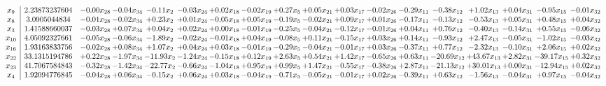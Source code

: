 \documentclass[9pt]{article}
\begin{document}
 \[\begin{array}{c| c c@{\hskip 2pt} c@{\hskip 2pt} c@{\hskip 2pt} c@{\hskip 2pt} c@{\hskip 2pt} c@{\hskip 2pt} c@{\hskip 2pt} c@{\hskip 2pt} c@{\hskip 2pt} c@{\hskip 2pt} c@{\hskip 2pt} c@{\hskip 2pt} c@{\hskip 2pt} c@{\hskip 2pt} c@{\hskip 2pt} c@{\hskip 2pt} }
 x_{9}   &  2.23873237604 & -0.00 x_{28} & -0.04 x_{34} & -0.11 x_{2} & -0.03 x_{24} & +  0.02 x_{18} & -0.02 x_{19} & +  0.27 x_{5} & +  0.05 x_{21} & +  0.03 x_{17} & -0.02 x_{26} & -0.29 x_{11} & -0.38 x_{12} & +  1.02 x_{13} & +  0.04 x_{31} & -0.95 x_{15} & -0.01 x_{32}\\
 x_{8}   &  3.0905044834 & -0.01 x_{28} & -0.02 x_{34} & +  0.23 x_{2} & +  0.01 x_{24} & -0.05 x_{18} & +  0.05 x_{19} & -0.19 x_{5} & -0.02 x_{21} & +  0.09 x_{17} & +  0.01 x_{26} & -0.17 x_{11} & -0.13 x_{12} & -0.53 x_{13} & +  0.05 x_{31} & +  0.48 x_{15} & +  0.04 x_{32}\\
 x_{3}   &  1.41588660037 & -0.03 x_{28} & +  0.07 x_{34} & +  0.04 x_{2} & +  0.02 x_{24} & +  0.00 x_{18} & -0.01 x_{19} & -0.25 x_{5} & -0.04 x_{21} & -0.12 x_{17} & -0.01 x_{26} & +  0.04 x_{11} & +  0.76 x_{12} & -0.40 x_{13} & -0.14 x_{31} & +  0.55 x_{15} & -0.06 x_{32}\\
 x_{10}   &  4.05092327661 & -0.05 x_{28} & -0.06 x_{34} & -1.89 x_{2} & -0.02 x_{24} & -0.01 x_{18} & +  0.04 x_{19} & -0.08 x_{5} & +  0.11 x_{21} & -0.15 x_{17} & +  0.03 x_{26} & +  0.14 x_{11} & -0.93 x_{12} & +  2.47 x_{13} & -0.05 x_{31} & -1.02 x_{15} & -0.03 x_{32}\\
 x_{16}   &  1.93163833756 & -0.02 x_{28} & +  0.08 x_{34} & +  1.07 x_{2} & +  0.04 x_{24} & +  0.03 x_{18} & -0.01 x_{19} & -0.29 x_{5} & -0.04 x_{21} & -0.01 x_{17} & +  0.03 x_{26} & -0.37 x_{11} & +  0.77 x_{12} & -2.32 x_{13} & -0.10 x_{31} & +  2.06 x_{15} & +  0.02 x_{32}\\
 x_{22}   &  33.1315194786 & +  0.22 x_{28} & -1.97 x_{34} & -11.93 x_{2} & -1.24 x_{24} & -0.15 x_{18} & +  0.12 x_{19} & +  2.63 x_{5} & +  0.54 x_{21} & +  1.42 x_{17} & -0.65 x_{26} & +  0.63 x_{11} & -20.69 x_{12} & + 43.67 x_{13} & +  2.82 x_{31} & -39.17 x_{15} & +  0.32 x_{32}\\
 x_{23}   &  41.7067584843 & -0.32 x_{28} & -1.42 x_{34} & -22.77 x_{2} & -0.66 x_{24} & -1.04 x_{18} & +  0.95 x_{19} & +  0.99 x_{5} & +  1.47 x_{21} & -0.55 x_{17} & -0.38 x_{26} & +  2.87 x_{11} & -21.13 x_{12} & + 30.01 x_{13} & +  0.00 x_{31} & -12.94 x_{15} & +  0.02 x_{32}\\
 x_{4}   &  1.92094776845 & -0.04 x_{28} & +  0.06 x_{34} & -0.15 x_{2} & +  0.06 x_{24} & +  0.03 x_{18} & -0.04 x_{19} & -0.71 x_{5} & -0.05 x_{21} & -0.01 x_{17} & +  0.02 x_{26} & -0.39 x_{11} & +  0.63 x_{12} & -1.56 x_{13} & -0.04 x_{31} & +  0.97 x_{15} & -0.04 x_{32}\\

\end{array}\]
\end{document}
